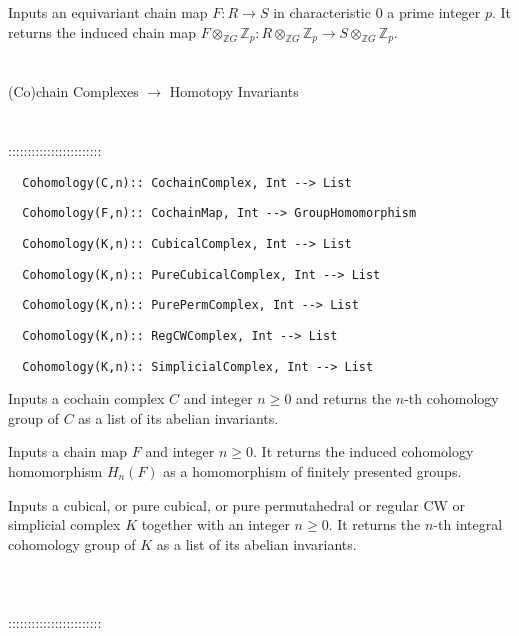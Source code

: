 \documentclass[a4paper,11pt]{report}
\begin{document}
{ Inputs an equivariant chain map $F\colon R \rightarrow S$ in characteristic $0$ a prime integer $p$. It returns the induced chain map $F\otimes_{\mathbb ZG}\mathbb Z_p \colon R \otimes_{\mathbb ZG} {\mathbb Z}_p
\longrightarrow S \otimes_{\mathbb ZG} {\mathbb Z}_p$. \\
 \\
 \\
 (Co)chain Complexes $\longrightarrow $ Homotopy Invariants \\
 \\
 \\
 ::::::::::::::::::::::::\\
 
\begin{verbatim}  Cohomology(C,n):: CochainComplex, Int --> List
\end{verbatim}
 
\begin{verbatim}  Cohomology(F,n):: CochainMap, Int --> GroupHomomorphism
\end{verbatim}
 
\begin{verbatim}  Cohomology(K,n):: CubicalComplex, Int --> List
\end{verbatim}
 
\begin{verbatim}  Cohomology(K,n):: PureCubicalComplex, Int --> List
\end{verbatim}
 
\begin{verbatim}  Cohomology(K,n):: PurePermComplex, Int --> List
\end{verbatim}
 
\begin{verbatim}  Cohomology(K,n):: RegCWComplex, Int --> List
\end{verbatim}
 
\begin{verbatim}  Cohomology(K,n):: SimplicialComplex, Int --> List
\end{verbatim}


 

 Inputs a cochain complex $C$ and integer $n \ge 0$ and returns the $n$-th cohomology group of $C$ as a list of its abelian invariants. 

 Inputs a chain map $F$ and integer $n \ge 0$. It returns the induced cohomology homomorphism $H_n(F)$ as a homomorphism of finitely presented groups. 

 Inputs a cubical, or pure cubical, or pure permutahedral or regular CW or
simplicial complex $K$ together with an integer $n \ge 0$. It returns the $n$-th integral cohomology group of $K$ as a list of its abelian invariants. \\
 \\
 \\
 \\
 ::::::::::::::::::::::::\\
 
}
\end{document}
